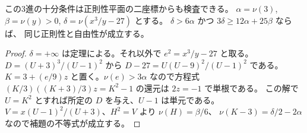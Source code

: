 \begin{corollary}
この3進の十分条件は正則性平面の二座標からも検査できる。
$\alpha=\nu(3)$, $\beta=\nu(y)>0$, $\delta=\nu(x^3/y-27)$ とする。
$\delta>6\alpha$ かつ $3\delta\ge12\alpha+25\beta$ ならば、
同じ正則性と自由性が成立する。
\end{corollary}
\begin{proof}
$\delta=+\infty$ は定理による。それ以外で $e^2=x^3/y-27$ と取る。
$D=(U+3)^3/(U-1)^2$ から $D-27=U(U-9)^2/(U-1)^2$ である。
$K=3+(e/9)z$ と置く。$\nu(e)>3\alpha$ なので方程式
$(K/3)((K+3)/3)z=K^2-1$ の還元は $2z=-1$ で単根である。
この解で $U=K^2$ とすれば所定の $D$ を与え、$U-1$ は単元である。
$V=x(U-1)^2/(U+3)$、$H^2=V$ より $\nu(H)=\beta/6$、
$\nu(K-3)=\delta/2-2\alpha$ なので補題の不等式が成立する。
\end{proof}
